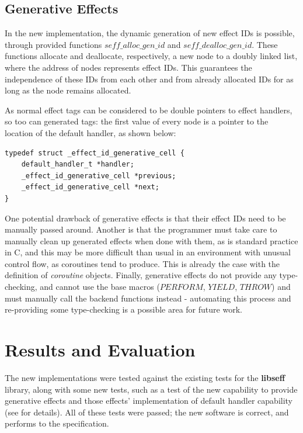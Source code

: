 \documentclass[logo,bsc,singlespacing,parskip,online]{infthesis}
\begin{document}
\section{Generative Effects}

In the new implementation, the dynamic generation of new effect IDs is possible, through provided functions $seff\_alloc\_gen\_id$ and $seff\_dealloc\_gen\_id$. These functions allocate and deallocate, respectively, a new node to a doubly linked list, where the address of nodes represents effect IDs. This guarantees the independence of these IDs from each other and from already allocated IDs for as long as the node remains allocated.

As normal effect tags can be considered to be double pointers to effect handlers, so too can generated tags: the first value of every node is a pointer to the location of the default handler, as shown below:

\begin{lstlisting}
typedef struct _effect_id_generative_cell {
    default_handler_t *handler;
    _effect_id_generative_cell *previous;
    _effect_id_generative_cell *next;
}
\end{lstlisting}

One potential drawback of generative effects is that their effect IDs need to be manually passed around. Another is that the programmer must take care to manually clean up generated effects when done with them, as is standard practice in C, and this may be more difficult than usual in an environment with unusual control flow, as coroutines tend to produce. This is already the case with the definition of \textit{coroutine} objects. Finally, generative effects do not provide any type-checking, and cannot use the base macros ($PERFORM$, $YIELD$, $THROW$) and must manually call the backend functions instead - automating this process and re-providing some type-checking is a possible area for future work.





\chapter{Results and Evaluation} \label{eval}

The new implementations were tested against the existing tests for the \textbf{libseff} library, along with some new tests, such as a test of the new capability to provide generative effects and those effects' implementation of default handler capability (see  for details). All of these tests were passed; the new software is correct, and performs to the specification.
\end{document}
